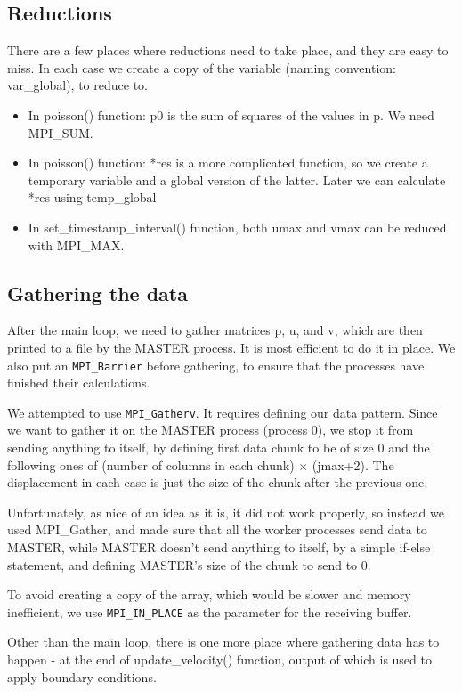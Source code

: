 \documentclass[11pt,journal]{article}
\begin{document}
	\subsection{Reductions}
	There are a few places where reductions need to take place, and they are easy to miss. In each case we create a copy of the variable (naming convention: var\_global), to reduce to.
	 \begin{itemize}
	 	\item In poisson() function: p0 is the sum of squares of the values in p. We need MPI\_SUM.
	 	\item In poisson() function: *res is a more complicated function, so we create a temporary variable and a global version of the latter. Later we can calculate *res using temp\_global
	 	\item In set\_timestamp\_interval() function, both umax and vmax can be reduced with MPI\_MAX.
	 \end{itemize}
 

	
	\subsection{Gathering the data}
	After the main loop, we need to gather matrices p, u, and v, which are then printed to a file by the MASTER process. It is most efficient to do it in place. We also put an \texttt{MPI\_Barrier} before gathering, to ensure that the processes have finished their calculations.
	
	We attempted to use \texttt{MPI\_Gatherv}. It requires defining our data pattern. Since we want to gather it on the MASTER process (process 0), we stop it from sending anything to itself, by defining first data chunk to be of size 0 and the following ones of (number of columns in each chunk) $\times$ (jmax+2). The displacement in each case is just the size of the chunk after the previous one.
	
	Unfortunately, as nice of an idea as it is, it did not work properly, so instead we used MPI\_Gather, and made sure that all the worker processes send data to MASTER, while MASTER doesn't send anything to itself, by a simple if-else statement, and defining MASTER's size of the chunk to send to 0.
	
	To avoid creating a copy of the array, which would be slower and memory inefficient, we use \texttt{MPI\_IN\_PLACE} as the parameter for the receiving buffer. 

	Other than the main loop, there is one more place where gathering data has to happen - at the end of update\_velocity() function, output of which is used to apply boundary conditions.
	
\end{document}
